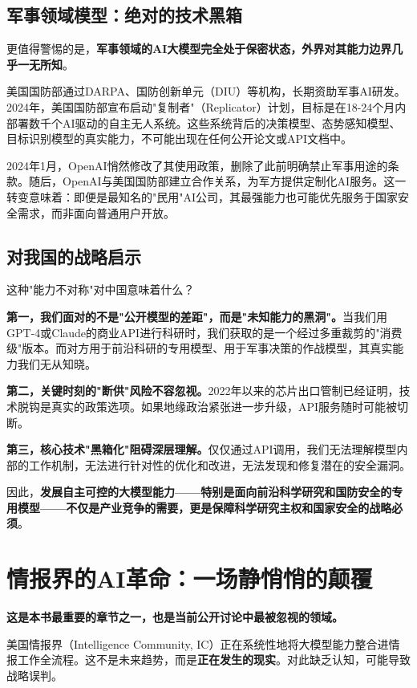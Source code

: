 \subsection{军事领域模型：绝对的技术黑箱}

更值得警惕的是，\textbf{军事领域的AI大模型完全处于保密状态，外界对其能力边界几乎一无所知}。

美国国防部通过DARPA、国防创新单元（DIU）等机构，长期资助军事AI研发。2024年，美国国防部宣布启动"复制者"（Replicator）计划，目标是在18-24个月内部署数千个AI驱动的自主无人系统。这些系统背后的决策模型、态势感知模型、目标识别模型的真实能力，不可能出现在任何公开论文或API文档中。

2024年1月，OpenAI悄然修改了其使用政策，删除了此前明确禁止军事用途的条款。随后，OpenAI与美国国防部建立合作关系，为军方提供定制化AI服务。这一转变意味着：即便是最知名的"民用"AI公司，其最强能力也可能优先服务于国家安全需求，而非面向普通用户开放。

\subsection{对我国的战略启示}

这种"能力不对称"对中国意味着什么？

\textbf{第一，我们面对的不是"公开模型的差距"，而是"未知能力的黑洞"。}当我们用GPT-4或Claude的商业API进行科研时，我们获取的是一个经过多重裁剪的"消费级"版本。而对方用于前沿科研的专用模型、用于军事决策的作战模型，其真实能力我们无从知晓。

\textbf{第二，关键时刻的"断供"风险不容忽视。}2022年以来的芯片出口管制已经证明，技术脱钩是真实的政策选项。如果地缘政治紧张进一步升级，API服务随时可能被切断。

\textbf{第三，核心技术"黑箱化"阻碍深层理解。}仅仅通过API调用，我们无法理解模型内部的工作机制，无法进行针对性的优化和改进，无法发现和修复潜在的安全漏洞。

因此，\textbf{发展自主可控的大模型能力——特别是面向前沿科学研究和国防安全的专用模型——不仅是产业竞争的需要，更是保障科学研究主权和国家安全的战略必须}。

\section{情报界的AI革命：一场静悄悄的颠覆}

\textbf{这是本书最重要的章节之一，也是当前公开讨论中最被忽视的领域。}

美国情报界（Intelligence Community, IC）正在系统性地将大模型能力整合进情报工作全流程。这不是未来趋势，而是\textbf{正在发生的现实}。对此缺乏认知，可能导致战略误判。

